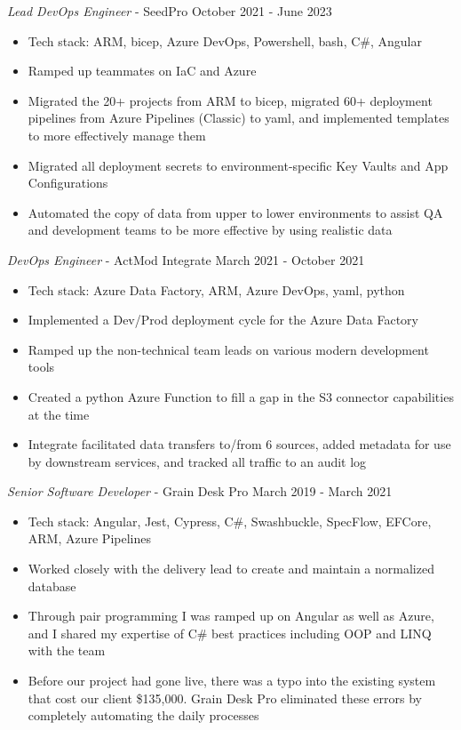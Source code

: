 \documentclass[line,margin]{res}
\begin{document}
\begin{resume}
	{\sl Lead DevOps Engineer} - SeedPro \hfill October 2021 - June 2023 
	\begin{itemize}
		\item Tech stack: ARM, bicep, Azure DevOps, Powershell, bash, C\#, Angular
		\item Ramped up teammates on IaC and Azure
		\item Migrated the 20+ projects from ARM to bicep, 
			migrated 60+ deployment pipelines from Azure Pipelines (Classic) to yaml, 
			and implemented templates to more effectively manage them
		\item Migrated all deployment secrets to environment-specific Key Vaults and App Configurations
		\item Automated the copy of data from upper to lower environments to assist QA and development teams to be more effective by using realistic data
	\end{itemize} 
	{\sl DevOps Engineer} - ActMod Integrate \hfill March 2021 - October 2021
	\begin{itemize}
		\item Tech stack: Azure Data Factory, ARM, Azure DevOps, yaml, python
		\item Implemented a Dev/Prod deployment cycle for the Azure Data Factory
		\item Ramped up the non-technical team leads on various modern development tools
		\item Created a python Azure Function to fill a gap in the S3 connector capabilities at the time
		\item Integrate facilitated data transfers to/from 6 sources, added metadata for use by downstream services, 
			and tracked all traffic to an audit log
	\end{itemize}
	{\sl Senior Software Developer} - Grain Desk Pro \hfill March 2019 - March 2021
	\begin{itemize}
		\item Tech stack: Angular, Jest, Cypress, C\#, Swashbuckle, SpecFlow, EFCore, ARM, Azure Pipelines
		\item Worked closely with the delivery lead to create and maintain a normalized database
		\item Through pair programming I was ramped up on Angular as well as Azure, 
			and I shared my expertise of C\# best practices including OOP and LINQ with the team
		\item Before our project had gone live, there was a typo into the existing system that cost our client \$135,000. 
			Grain Desk Pro eliminated these errors by completely automating the daily processes 

\end{itemize}
\end{resume}
\end{document}
